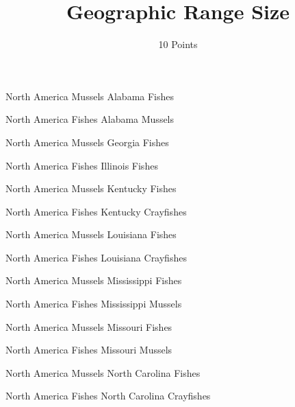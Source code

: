 \documentclass[12pt]{article}
\title{Geographic Range Size}
\author{10 Points}
\date{}                                           %
\begin{document}
\thispagestyle{first_page}


{\Large
\begin{multicols}{2}
North America Mussels\newline
Alabama Fishes

\bigskip

North America Fishes\newline
Alabama Mussels

\bigskip

North America Mussels\newline
Georgia Fishes

\bigskip

North America Fishes\newline
Illinois Fishes

\bigskip

North America Mussels\newline
Kentucky Fishes

\bigskip

North America Fishes\newline
Kentucky Crayfishes

\bigskip

North America Mussels\newline
Louisiana Fishes

\bigskip

North America Fishes\newline
Louisiana Crayfishes

\bigskip

North America Mussels\newline
Mississippi Fishes

\bigskip

North America Fishes\newline
Mississippi Mussels

\bigskip

North America Mussels\newline
Missouri Fishes

\bigskip

North America Fishes\newline
Missouri Mussels

\bigskip

North America Mussels\newline
North Carolina Fishes

\bigskip

North America Fishes\newline
North Carolina Crayfishes

\bigskip


\end{multicols}}
\end{document}
